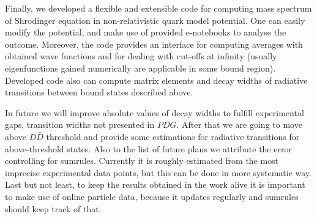 Finally, we developed a flexible and extensible code for computing mass spectrum of Shrodinger equation in non-relativistic quark model potential. One can easily modify the potential, and make use of provided e-notebooks to analyse the outcome. Moreover, the code provides an interface for computing averages with obtained wave functions and for dealing with cut-offs at infinity (usually eigenfunctions gained numerically are applicable in some bound region). Developed code also can compute matrix elements and decay widths of radiative transitions between bound states described above.

In future we will improve absolute values of decay widths to fulfill experimental gaps, transition widths not presented in $PDG$. After that we are going to move above $D\bar{D}$ threshold and provide some estimations for radiative transitions for above-threshold states. Also to the list of future plans we attribute the error controlling for sumrules. Currently it is roughly estimated from the most imprecise experimental data points, but this can be done in more systematic way. Last but not least, to keep the results obtained in the work alive it is important to make use of online particle data, because it updates regularly and sumrules should keep track of that.

